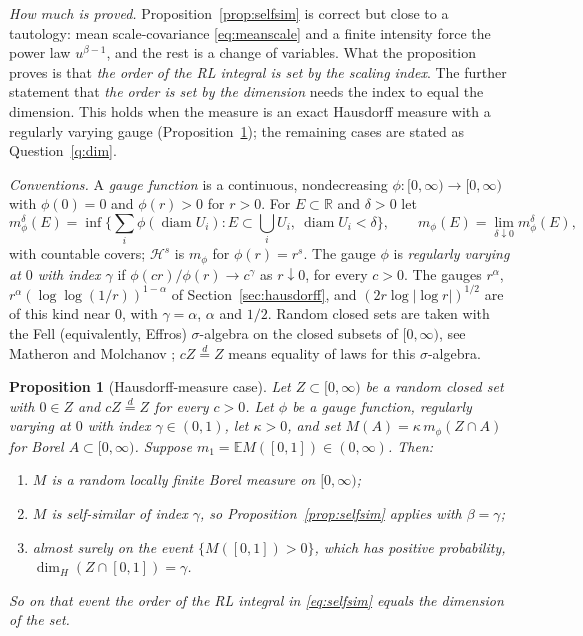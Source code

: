 \documentclass[11pt]{article}
\newtheorem{proposition}[theorem]{Proposition}
\theoremstyle{remark}
\theoremstyle{definition}
\newcommand{\E}{\mathbb{E}}
\newcommand{\R}{\mathbb{R}}
\begin{document}
\emph{How much is proved.} Proposition~\ref{prop:selfsim} is correct but close to a tautology: mean scale-covariance \eqref{eq:meanscale} and a finite intensity force the power law $u^{\beta-1}$, and the rest is a change of variables. What the proposition proves is that \emph{the order of the RL integral is set by the scaling index}. The further statement that \emph{the order is set by the dimension} needs the index to equal the dimension. This holds when the measure is an exact Hausdorff measure with a regularly varying gauge (Proposition~\ref{prop:hausdim}); the remaining cases are stated as Question~\ref{q:dim}.

\emph{Conventions.} A \emph{gauge function} is a continuous, nondecreasing $\phi:[0,\infty)\to[0,\infty)$ with $\phi(0)=0$ and $\phi(r)>0$ for $r>0$. For $E\subset\R$ and $\delta>0$ let
\[
m_\phi^\delta(E)=\inf\Big\{\sum_i\phi(\operatorname{diam}U_i):E\subset\bigcup_iU_i,\ \operatorname{diam}U_i<\delta\Big\},\qquad m_\phi(E)=\lim_{\delta\downarrow0}m_\phi^\delta(E),
\]
with countable covers; $\mathcal H^s$ is $m_\phi$ for $\phi(r)=r^s$. The gauge $\phi$ is \emph{regularly varying at $0$ with index $\gamma$} if $\phi(cr)/\phi(r)\to c^\gamma$ as $r\downarrow0$, for every $c>0$. The gauges $r^\alpha$, $r^\alpha(\log\log(1/r))^{1-\alpha}$ of Section~\ref{sec:hausdorff}, and $(2r\log|\log r|)^{1/2}$ are of this kind near $0$, with $\gamma=\alpha$, $\alpha$ and $1/2$. Random closed sets are taken with the Fell (equivalently, Effros) $\sigma$-algebra on the closed subsets of $[0,\infty)$, see Matheron \cite{Mat75} and Molchanov \cite{Mol17}; $cZ\overset{d}{=}Z$ means equality of laws for this $\sigma$-algebra.

\begin{proposition}[Hausdorff-measure case]\label{prop:hausdim}
Let $Z\subset[0,\infty)$ be a random closed set with $0\in Z$ and $cZ\overset{d}{=}Z$ for every $c>0$. Let $\phi$ be a gauge function, regularly varying at $0$ with index $\gamma\in(0,1)$, let $\kappa>0$, and set $M(A)=\kappa\,m_\phi(Z\cap A)$ for Borel $A\subset[0,\infty)$. Suppose $m_1=\E M([0,1])\in(0,\infty)$. Then:
\begin{enumerate}
\item $M$ is a random locally finite Borel measure on $[0,\infty)$;
\item $M$ is self-similar of index $\gamma$, so Proposition~\ref{prop:selfsim} applies with $\beta=\gamma$;
\item almost surely on the event $\{M([0,1])>0\}$, which has positive probability, $\dim_H(Z\cap[0,1])=\gamma$.
\end{enumerate}
So on that event the order of the RL integral in \eqref{eq:selfsim} equals the dimension of the set.
\end{proposition}
\end{document}
